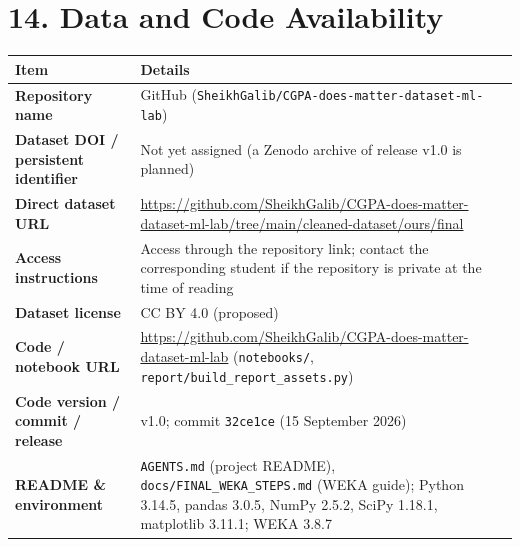 \documentclass[11pt,a4paper]{article}
\newcommand{\hd}[1]{\textbf{#1}}
\begin{document}
\section{14. Data and Code Availability}
{\small
\begin{tabularx}{\linewidth}{|L{55mm}|Y|}
\hline
{}\hd{Item} & \hd{Details} \\ \hline
\hd{Repository name} & GitHub (\texttt{SheikhGalib/CGPA-does-matter-dataset-ml-lab}) \\ \hline
\hd{Dataset DOI / persistent identifier} & Not yet assigned (a Zenodo archive of release v1.0 is planned) \\ \hline
\hd{Direct dataset URL} & \url{https://github.com/SheikhGalib/CGPA-does-matter-dataset-ml-lab/tree/main/cleaned-dataset/ours/final} \\ \hline
\hd{Access instructions} & Access through the repository link; contact the corresponding student if the repository is private at the time of reading \\ \hline
\hd{Dataset license} & CC BY 4.0 (proposed) \\ \hline
\hd{Code / notebook URL} & \url{https://github.com/SheikhGalib/CGPA-does-matter-dataset-ml-lab} (\texttt{notebooks/}, \texttt{report/build\_report\_assets.py}) \\ \hline
\hd{Code version / commit / release} & v1.0; commit \texttt{32ce1ce} (15 September 2026) \\ \hline
\hd{README \& environment} & \texttt{AGENTS.md} (project README), \texttt{docs/FINAL\_WEKA\_STEPS.md} (WEKA guide); Python 3.14.5, pandas 3.0.5, NumPy 2.5.2, SciPy 1.18.1, matplotlib 3.11.1; WEKA 3.8.7 \\ \hline
\end{tabularx}}

\end{document}
